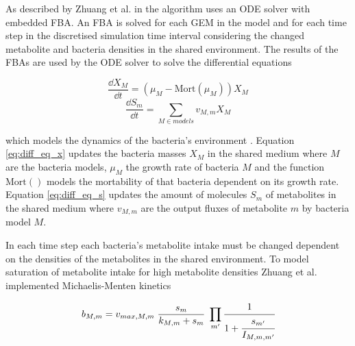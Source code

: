 As described by Zhuang et al. in \cite{zhuang_genome-scale_2011} the algorithm uses an ODE solver with embedded FBA. An FBA is solved
for each GEM in the model and for each time step in the discretised simulation time interval considering the changed metabolite and
bacteria densities in the shared environment. The results of the FBAs are used by the ODE solver to solve the differential equations

\begin{equation} \label{eq:diff_eq_x}
	\frac{\dd X_M}{\dd t} = (\mu_M - \mathrm{Mort}(\mu_M)) X_M
\end{equation}
\begin{equation} \label{eq:diff_eq_s}
	\frac{\dd S_m}{\dd t} = \displaystyle\sum_{M \in models} v_{M,m} X_M
\end{equation}

which models the dynamics of the bacteria's environment \cite{zhuang_design_2012}. Equation \ref{eq:diff_eq_x} updates
the bacteria masses $X_M$ in the shared medium where $M$ are the bacteria models, $\mu_M$ the growth rate of bacteria $M$ and the function
$\mathrm{Mort}()$ models the mortability of that bacteria dependent on its growth rate.
Equation \ref{eq:diff_eq_s} updates the amount of molecules $S_m$ of metabolites in the shared medium where $v_{M,m}$ are the
output fluxes of metabolite $m$ by bacteria model $M$.

In each time step each bacteria's metabolite intake must be changed dependent on the densities of the metabolites in the shared environment.
To model saturation of metabolite intake for high metabolite densities Zhuang et al. implemented Michaelis-Menten kinetics \cite{johnson2011original}

\begin{equation} \label{eq:michaelis-menten}
 b_{M,m} = v_{max,M,m} \; \frac{s_m}{k_{M,m}+s_m} \; \prod_{m'} \cfrac{1}{1+\cfrac{s_{m'}}{I_{M,m,m'}}}
\end{equation}


